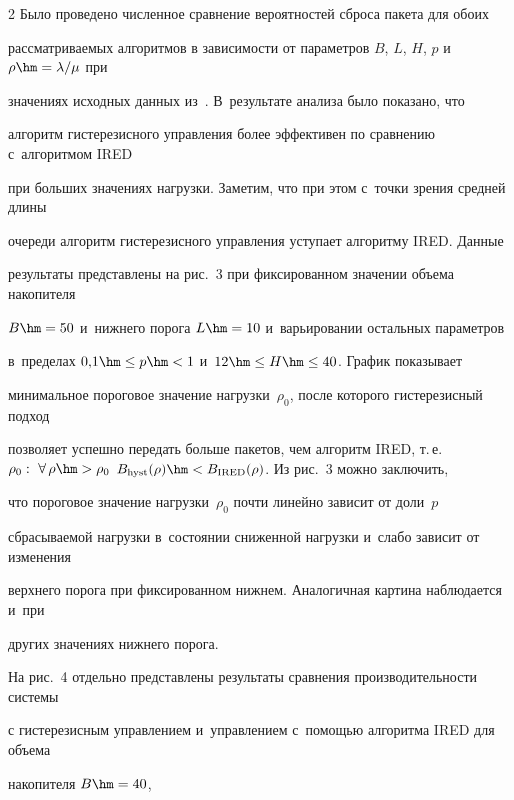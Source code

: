 \begin{multicols}{2}
  Было проведено численное сравнение вероятностей сброса пакета для обоих 


рассматриваемых алгоритмов в зависимости от параметров $B$, $L$, $H$, $p$ и~$\rho\hm=\lambda/\mu$ при 


значениях исходных данных из~\cite{5-al}. В~результате анализа было показано, что 


алгоритм гистерезисного управ\-ле\-ния более эффективен по сравнению с~алгоритмом IRED 


при больших значениях нагрузки. Заметим, что при этом с~точ\-ки зрения средней длины 


очереди алгоритм гистерезисного управ\-ле\-ния уступает алгоритму IRED. Данные 


результаты пред\-став\-ле\-ны на рис.~3 при фиксированном значении объема накопителя 


$B\hm=50$ и~нижнего порога $L\hm=10$ и~варьировании остальных па\-ра\-мет\-ров 


в~пределах $0{,}1\hm\leq p\hm < 1$ и~$12\hm\leq H\hm\leq 40$. График показывает 


минимальное пороговое значение нагрузки~$\rho_0$, после которого гистерезисный подход 


позволяет успешно передать больше пакетов, чем алгоритм IRED, т.\,е.\ $\rho_0:\ 


\forall\,\rho \hm> \rho_0$ $B_{\mathrm{hyst}}(\rho)\hm< B_{\mathrm{IRED}}(\rho)$. Из рис.~3 можно заключить, 


что пороговое значение нагрузки~$\rho_0$ почти линейно зависит от доли~$p$ 


сбрасываемой нагрузки в~со\-сто\-янии сниженной на\-груз\-ки и~слабо зависит от изменения 


верхнего порога при фиксированном нижнем. Аналогичная картина наблюдается и~при 


других значениях нижнего порога.


  


   На рис.~4 отдельно представлены результаты сравнения производительности сис\-те\-мы 


с гистерезисным управ\-ле\-ни\-ем и~управ\-ле\-ни\-ем с~по\-мощью алгоритма IRED для объема 


накопителя $B\hm=40$,\linebreak\vspace*{-12pt}





\pagebreak





\end{multicols}





